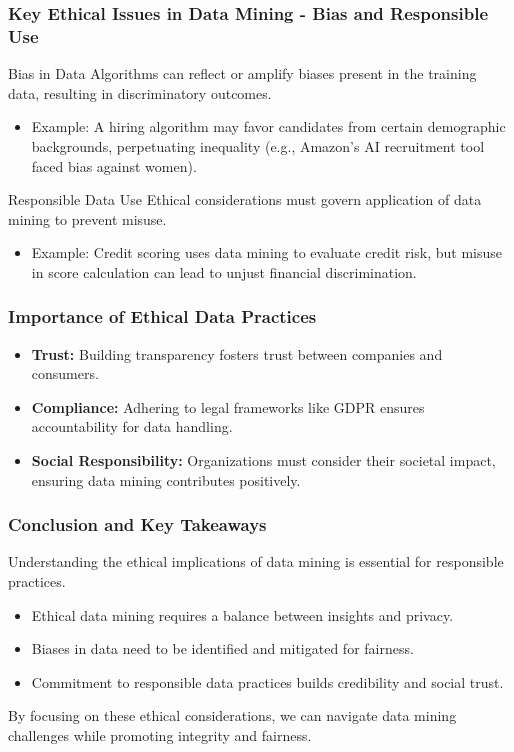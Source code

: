 \documentclass[aspectratio=169]{beamer}
\begin{document}
\begin{frame}[fragile]
    \frametitle{Key Ethical Issues in Data Mining - Bias and Responsible Use}
    \begin{block}{Bias in Data}
        Algorithms can reflect or amplify biases present in the training data, resulting in discriminatory outcomes.
        \begin{itemize}
            \item Example: A hiring algorithm may favor candidates from certain demographic backgrounds, perpetuating inequality (e.g., Amazon's AI recruitment tool faced bias against women).
        \end{itemize}
    \end{block}
    
    \vspace{0.5cm}
    
    \begin{block}{Responsible Data Use}
        Ethical considerations must govern application of data mining to prevent misuse.
        \begin{itemize}
            \item Example: Credit scoring uses data mining to evaluate credit risk, but misuse in score calculation can lead to unjust financial discrimination.
        \end{itemize}
    \end{block}
\end{frame}

\begin{frame}[fragile]
    \frametitle{Importance of Ethical Data Practices}
    \begin{itemize}
        \item \textbf{Trust:} Building transparency fosters trust between companies and consumers.
        \item \textbf{Compliance:} Adhering to legal frameworks like GDPR ensures accountability for data handling.
        \item \textbf{Social Responsibility:} Organizations must consider their societal impact, ensuring data mining contributes positively.
    \end{itemize}
\end{frame}

\begin{frame}[fragile]
    \frametitle{Conclusion and Key Takeaways}
    Understanding the ethical implications of data mining is essential for responsible practices.
    \begin{itemize}
        \item Ethical data mining requires a balance between insights and privacy.
        \item Biases in data need to be identified and mitigated for fairness.
        \item Commitment to responsible data practices builds credibility and social trust.
    \end{itemize}
    \vspace{0.3cm}
    By focusing on these ethical considerations, we can navigate data mining challenges while promoting integrity and fairness.
\end{frame}
\end{document}

